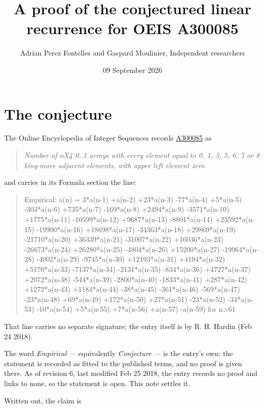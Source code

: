 \documentclass[11pt]{article}
\title{A proof of the conjectured linear recurrence for OEIS A300085}
\author{Adrian Perez Fontelles and Gaspard Moulinier, Independent researchers}
\date{09 September 2026}
\theoremstyle{definition}
\begin{document}
\maketitle
\section{The conjecture}

The Online Encyclopedia of Integer Sequences records \href{https://oeis.org/A300085}{A300085} as

\begin{quote}\itshape Number of nX4 0..1 arrays with every element equal to 0, 1, 3, 5, 6, 7 or 8 king-move adjacent elements, with upper left element zero\end{quote}

and carries in its Formula section the line:

\begin{quote}\ttfamily Empirical: a(n) = 3*a(n-1) +a(n-2) +23*a(n-3) -77*a(n-4) +5*a(n-5) -303*a(n-6) +735*a(n-7) -169*a(n-8) +2494*a(n-9) -3571*a(n-10) +1775*a(n-11) -10599*a(n-12) +9687*a(n-13) -8801*a(n-14) +23592*a(n-15) -19900*a(n-16) +18698*a(n-17) -34363*a(n-18) +29869*a(n-19) -21710*a(n-20) +36339*a(n-21) -31007*a(n-22) +16036*a(n-23) -26673*a(n-24) +26280*a(n-25) -4804*a(n-26) +15200*a(n-27) -19964*a(n-28) -4002*a(n-29) -9745*a(n-30) +12193*a(n-31) +4104*a(n-32) +5170*a(n-33) -7137*a(n-34) -2131*a(n-35) -834*a(n-36) +4727*a(n-37) +2072*a(n-38) -544*a(n-39) -2800*a(n-40) -1833*a(n-41) +287*a(n-42) +1272*a(n-43) +1184*a(n-44) -38*a(n-45) -361*a(n-46) -569*a(n-47) -23*a(n-48) +69*a(n-49) +172*a(n-50) +27*a(n-51) -23*a(n-52) -34*a(n-53) -10*a(n-54) +5*a(n-55) +7*a(n-56) +a(n-57) -a(n-59) for n>61\end{quote}

That line carries no separate signature; the entry itself is by R. H. Hardin (Feb 24 2018).

The word {\itshape Empirical} --- equivalently {\itshape Conjecture} --- is the entry's own: the statement is recorded as fitted to the published terms, and no proof is given there. As of revision 6, last modified Feb 25 2018, the entry records no proof and links to none, so the statement is open. This note settles it.

Written out, the claim is
\end{document}
